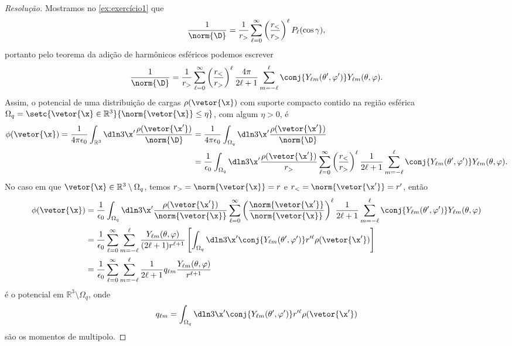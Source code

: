 \begin{proof}[Resolução]
    Mostramos no \cref{ex:exercício1} que
    \begin{equation*}
        \frac{1}{\norm{\D}} = \frac{1}{r_>} \sum_{\ell = 0}^\infty \left(\frac{r_<}{r_>}\right)^\ell P_\ell(\cos \gamma),
    \end{equation*}
    portanto pelo teorema da adição de harmônicos esféricos podemos escrever
    \begin{equation*}
        \frac{1}{\norm{\D}} = \frac{1}{r_>} \sum_{\ell = 0}^\infty \left(\frac{r_<}{r_>}\right)^\ell \frac{4\pi}{2\ell + 1} \sum_{m = -\ell}^\ell \conj{Y_{\ell m}(\theta', \varphi')}Y_{\ell m}(\theta, \varphi).
    \end{equation*}
    Assim, o potencial de uma distribuição de cargas \(\rho(\vetor{\x})\) com suporte compacto contido na região esférica \(\Omega_q = \setc{\vetor{\x} \in \mathbb{R}^3}{\norm{\vetor{\x}} \leq \eta}\), com algum \(\eta > 0\), é
    \begin{align*}
        \phi(\vetor{\x}) = \frac{1}{4\pi \epsilon_0} \int_{\mathbb{R}^3} \dln3{\x'} \frac{\rho(\vetor{\x'})}{\norm{\D}}
        &= \frac{1}{4\pi \epsilon_0} \int_{\Omega_q} \dln3{\x'} \frac{\rho(\vetor{\x'})}{\norm{\D}}\\
        &= \frac{1}{\epsilon_0} \int_{\Omega_q} \dln3{\x'} \frac{\rho(\vetor{\x'})}{r_>}\sum_{\ell = 0}^\infty\left(\frac{r_<}{r_>}\right)^\ell \frac{1}{2\ell + 1} \sum_{m = -\ell}^\ell \conj{Y_{\ell m}(\theta', \varphi')} Y_{\ell m}(\theta, \varphi).
    \end{align*}
    No caso em que \(\vetor{\x} \in \mathbb{R}^3 \setminus \Omega_q\), temos \(r_> = \norm{\vetor{\x}} = r\) e \(r_< = \norm{\vetor{\x'}} = r'\), então
    \begin{align*}
        \phi(\vetor{\x})
        &= \frac{1}{\epsilon_0} \int_{\Omega_q} \dln3{\x'} \frac{\rho(\vetor{\x'})}{\norm{\vetor{\x}}}\sum_{\ell = 0}^\infty\left(\frac{\norm{\vetor{\x'}}}{\norm{\vetor{\x}}}\right)^\ell \frac{1}{2\ell + 1} \sum_{m = -\ell}^\ell \conj{Y_{\ell m}(\theta', \varphi')} Y_{\ell m}(\theta, \varphi)\\
        &= \frac{1}{\epsilon_0} \sum_{\ell = 0}^\infty \sum_{m = -\ell}^\ell \frac{Y_{\ell m}(\theta, \varphi)}{(2 \ell + 1)r^{\ell + 1}} \left[\int_{\Omega_q}\dln3{\x'} \conj{Y_{\ell m}(\theta', \varphi')}r'^\ell\rho(\vetor{\x'})\right]\\
        &= \frac{1}{\epsilon_0} \sum_{\ell = 0}^\infty \sum_{m = -\ell}^\ell \frac{1}{2\ell + 1} q_{\ell m} \frac{Y_{\ell m}(\theta, \varphi)}{r^{\ell + 1}}
    \end{align*}
    é o potencial em \(\mathbb{R}^3 \setminus \Omega_q\), onde
    \begin{equation*}
        q_{\ell m} = \int_{\Omega_q} \dln3{\x'}\conj{Y_{\ell m}(\theta',\varphi')} r'^\ell \rho(\vetor{\x'})
    \end{equation*}
    são os momentos de multipolo.
\end{proof}
